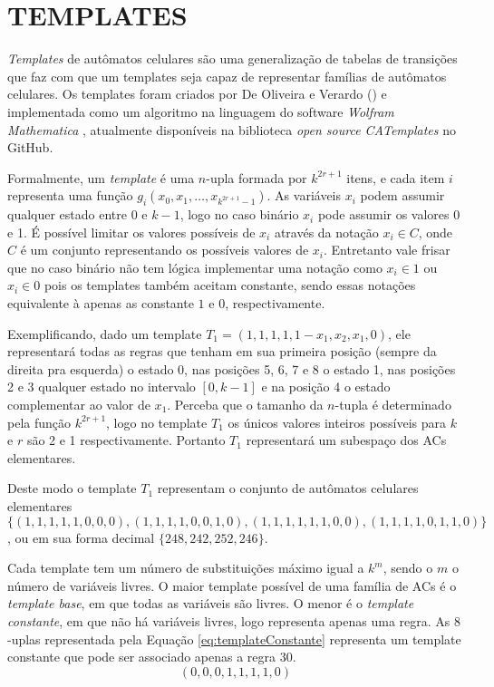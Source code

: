 \section{TEMPLATES}
\label{sec:templates}

\textit{Templates} de autômatos celulares são uma generalização de tabelas de transições que faz com que um templates seja capaz de representar famílias de autômatos celulares. Os templates foram criados por De Oliveira e Verardo (\citeyear{deOliveira2014}) e implementada como um algoritmo na linguagem do software \textit{Wolfram Mathematica} \cite{woframMathematica10}, atualmente disponíveis na biblioteca \textit{open source CATemplates} \cite{CATemplates} no GitHub.

Formalmente, um \textit{template} é uma $n$-upla formada por $k^{2r+1}$ itens, e cada item $i$ representa uma função $g_i(x_0,x_1,\dots,x_{k^{2r+1}-1})$. As variáveis $x_i$ podem assumir qualquer estado entre 0 e $k-1$, logo no caso binário $x_i$ pode assumir os valores 0 e 1. É possível limitar os valores possíveis de $x_i$ através da notação $x_i \in C$, onde $C$ é um conjunto representando os possíveis valores de $x_i$. Entretanto vale frisar que no caso binário não tem lógica implementar uma notação como $x_i \in {1}$ ou $x_i \in {0}$ pois os templates também aceitam constante, sendo essas notações equivalente à apenas as constante $1$ e $0$, respectivamente.

Exemplificando, dado um template $T_1 = (1,1,1,1,1-x_1,x_2,x_1,0)$, ele representará todas as regras que tenham em sua primeira posição (sempre da direita pra esquerda) o estado 0, nas posições 5, 6, 7 e 8 o estado 1, nas posições 2 e 3 qualquer estado no intervalo $[0,k-1]$ e na posição 4 o estado complementar ao valor de $x_1$. Perceba que o tamanho da $n$-tupla é determinado pela função $k^{2r+1}$, logo no template $T_1$ os únicos valores inteiros possíveis para $k$ e $r$ são 2 e 1 respectivamente. Portanto $T_1$ representará um subespaço dos ACs elementares.

Deste modo o template $T_1$ representam o conjunto de autômatos celulares elementares $\{(1,1,1,1,1,0,0,0),(1,1,1,1,0,0,1,0),(1,1,1,1,1,1,0,0),(1,1,1,1,0,1,1,0)\}$, ou em sua forma decimal $\{248,242,252,246\}$.

Cada template tem um número de substituições máximo igual a $k^m$, sendo o $m$ o número de variáveis livres. O maior template possível de uma família de ACs é o \textit{template base}, em que todas as variáveis são livres. O menor é o \textit{template constante}, em que não há variáveis livres, logo representa apenas uma regra. As $8$-uplas representada pela Equação \ref{eq:templateConstante} representa um template constante que pode ser associado apenas a regra 30. 
\begin{equation}
(0,0,0,1,1,1,1,0)
\label{eq:templateConstante}
\end{equation}

